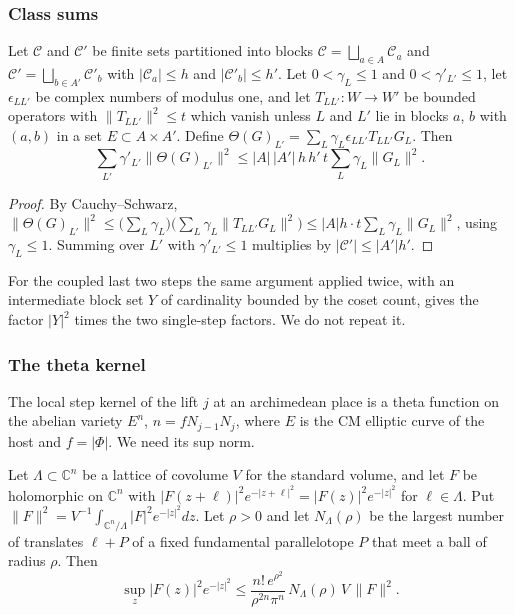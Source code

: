 \subsubsection{Class sums}

\begin{lemma}\label{w3:W3:schur}
Let $\mathcal C$ and $\mathcal C'$ be finite sets partitioned into blocks $\mathcal C=\bigsqcup_{a\in A}\mathcal C_a$ and $\mathcal C'=\bigsqcup_{b\in A'}\mathcal C'_b$ with $\lvert\mathcal C_a\rvert\le h$ and $\lvert\mathcal C'_b\rvert\le h'$. Let $0<\gamma_L\le1$ and $0<\gamma'_{L'}\le1$, let $\epsilon_{LL'}$ be complex numbers of modulus one, and let $T_{LL'}\colon W\to W'$ be bounded operators with $\lVert T_{LL'}\rVert^2\le t$ which vanish unless $L$ and $L'$ lie in blocks $a$, $b$ with $(a,b)$ in a set $E\subset A\times A'$. Define $\Theta(G)_{L'}=\sum_L\gamma_L\epsilon_{LL'}T_{LL'}G_L$. Then
\[
\sum_{L'}\gamma'_{L'}\lVert\Theta(G)_{L'}\rVert^2\le\lvert A\rvert\,\lvert A'\rvert\,h\,h'\,t\sum_L\gamma_L\lVert G_L\rVert^2 .
\]
\end{lemma}

\begin{proof}
By Cauchy--Schwarz, $\lVert\Theta(G)_{L'}\rVert^2\le\big(\sum_{L}\gamma_L\big)\big(\sum_L\gamma_L\lVert T_{LL'}G_L\rVert^2\big)\le\lvert A\rvert h\cdot t\sum_L\gamma_L\lVert G_L\rVert^2$, using $\gamma_L\le1$. Summing over $L'$ with $\gamma'_{L'}\le1$ multiplies by $\lvert\mathcal C'\rvert\le\lvert A'\rvert h'$.
\end{proof}

For the coupled last two steps the same argument applied twice, with an intermediate block set $Y$ of cardinality bounded by the coset count, gives the factor $\lvert Y\rvert^2$ times the two single-step factors. We do not repeat it.

\subsubsection{The theta kernel}

The local step kernel of the lift $j$ at an archimedean place is a theta function on the abelian variety $E^{n}$, $n=fN_{j-1}N_j$, where $E$ is the CM elliptic curve of the host and $f=\lvert\Phi\rvert$. We need its sup norm.

\begin{lemma}\label{w3:W3:supL2}
Let $\Lambda\subset\mathbb C^n$ be a lattice of covolume $V$ for the standard volume, and let $F$ be holomorphic on $\mathbb C^n$ with $\lvert F(z+\ell)\rvert^2e^{-\lvert z+\ell\rvert^2}=\lvert F(z)\rvert^2e^{-\lvert z\rvert^2}$ for $\ell\in\Lambda$. Put $\lVert F\rVert^2=V^{-1}\int_{\mathbb C^n/\Lambda}\lvert F\rvert^2e^{-\lvert z\rvert^2}dz$. Let $\rho>0$ and let $N_\Lambda(\rho)$ be the largest number of translates $\ell+P$ of a fixed fundamental parallelotope $P$ that meet a ball of radius $\rho$. Then
\[
\sup_z\lvert F(z)\rvert^2e^{-\lvert z\rvert^2}\le\frac{n!\,e^{\rho^2}}{\rho^{2n}\pi^n}\,N_\Lambda(\rho)\,V\,\lVert F\rVert^2 .
\]
\end{lemma}

